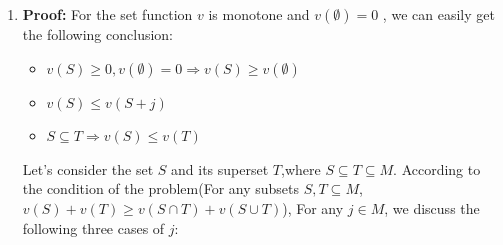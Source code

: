 \documentclass{article}
\begin{document}
\begin{enumerate}
   \item \textbf{Proof:}
   For the set function $v$ is monotone and $v(\emptyset) = 0$ , we can easily get the following conclusion:

   \begin{itemize}
      \item $ v(S) \ge 0, v(\emptyset) = 0 \Rightarrow v(S) \ge v(\emptyset)$
      \item $ v(S) \le v(S + j) $
      \item $S \subseteq T \Rightarrow v(S) \le v(T)$ 
   \end{itemize}

   Let's consider the set $S$ and its superset $T$,where $S \subseteq T \subseteq M$. According to the condition of the problem(For any subsets $S, T \subseteq M$, $v(S) + v(T) \ge v(S \cap T) + v(S \cup T)$), For any $j \in M$, we discuss the following three cases of $j$:

         
      


   

\end{enumerate}
\end{document}
